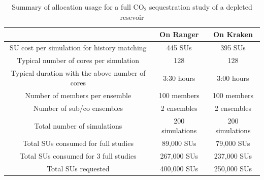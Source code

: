 \documentclass[a4paper,10pt]{article}
\begin{document}




\begin{table}[!h]
\begin{center}
 \caption{Summary of allocation usage for a full CO$_2$ sequestration study of a depleted resevoir}
\begin{tabular}{| c | c | c|}
\hline
& On Ranger & On Kraken \\
\hline
SU cost per simulation for history matching& 445 SUs & 395 SUs\\
\hline
Typical number of cores per simulation & 128 & 128 \\
\hline
Typical duration with the above number of cores & 3:30 hours & 3:00 hours \\
\hline
Number of members per ensemble & 100 members & 100 members \\ 
\hline
Number of sub/co ensembles & 2 ensembles & 2 ensembles \\ 
\hline
Total number of simulations & 200 simulations & 200 simulations\\
\hline
Total SUs consumed for full studies & 89,000 SUs & 79,000 SUs\\
\hline
Total SUs consumed for $3$ full studies & 267,000 SUs & 237,000 SUs\\
\hline
Total SUs requested & 400,000 SUs & 250,000 SUs\\
\hline
\end{tabular}
\end{center}
\end{table}
\end{document}
